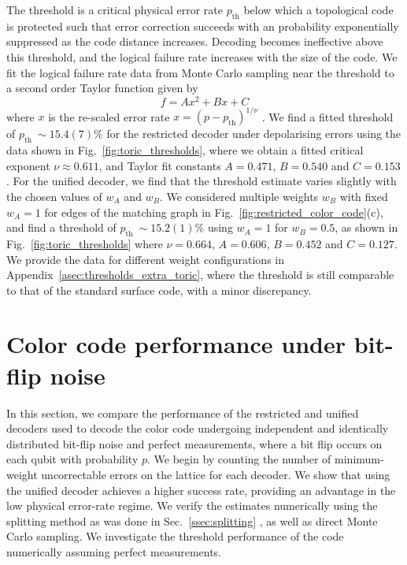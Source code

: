 \documentclass[a4paper,twocolumn,11pt,accepted=2024-12-23]{quantumarticle}
\begin{document}
The threshold is a critical physical error rate $p_{\textrm{th}}$ below which a topological code is protected such that error correction succeeds with an probability exponentially suppressed as the code distance increases. Decoding  becomes ineffective above this threshold, and the logical failure rate increases with the size of the code. We fit the logical failure rate data from Monte Carlo sampling near the threshold to a second order Taylor function given by 
\begin{equation}
    f = Ax^2+Bx+C 
    \label{eq:threshold_estimate}
\end{equation}
where $x$ is the re-scaled error rate $x = (p-p_{\textrm{th}})^{1/\nu}$ \cite{wang2003confinement}. We find a fitted threshold of $p_{\textrm{th}}~\sim 15.4(7)\%$ for the restricted decoder under depolarising errors using the data shown in Fig.~\ref{fig:toric_thresholds}, where we obtain a fitted critical exponent $\nu \approx 0.611$, and 
Taylor fit constants $A = 0.471$, $B = 0.540$ and $C = 0.153$. For the unified decoder, we find that the threshold estimate varies slightly with the chosen values of $w_A$ and $w_B$. We considered multiple weights $w_B$ with fixed $w_A=1$ for edges of the matching graph in Fig.~\ref{fig:restricted_color_code}(c), and find a threshold of $p_{\textrm{th}}~\sim 15.2(1)\%$ using $w_A = 1$ for $w_B = 0.5$, as shown in Fig.~\ref{fig:toric_thresholds} where $\nu = 0.664$, $A =  0.606$, $B = 0.452$ and $C = 0.127$. We provide the data for different weight configurations in Appendix~\ref{asec:thresholds_extra_toric}, where the threshold is still comparable to that of the standard surface code, with a minor discrepancy.



\section{\label{sec:results_color_code} Color code performance under bit-flip noise}




In this section, we compare the performance of the restricted and unified decoders used to decode the color code undergoing independent and identically distributed bit-flip noise and perfect measurements, where a bit flip occurs on each qubit with probability $p$. We begin by counting the number of minimum-weight uncorrectable errors on the lattice for each decoder. We show that using the unified decoder achieves a higher success rate, providing an advantage in the low physical error-rate regime.
We verify the estimates numerically using the splitting method as was done in Sec.~\ref{ssec:splitting} \cite{Bravyi_2013}, as well as direct Monte Carlo sampling. We investigate the threshold performance of the code numerically assuming perfect measurements. 
\end{document}
